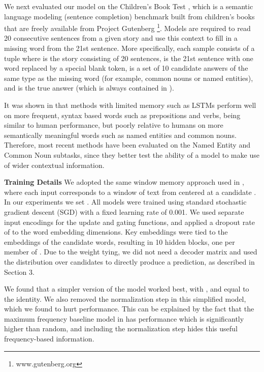 \documentclass{article} \usepackage{iclr2016_conference,times}
\begin{document}
We next evaluated our model on the Children's Book Test \citep{CBT}, which is a semantic language modeling (sentence completion) 
benchmark built from children's books that are freely available from Project Gutenberg \footnote{www.gutenberg.org}. 
Models are required to read 20 consecutive sentences from a given story and use this context to fill in a missing word from the 21st sentence. 
More specifically, each sample consists of a tuple  where  is the story consisting of 20 sentences,  is the 21st sentence with one word replaced by a special blank token,  is a set of 10 candidate answers of the same type as the missing word (for example, common nouns or named entities), and  is the true answer (which is always contained in ).

It was shown in \citep{CBT} that methods with limited memory such as LSTMs perform well on more frequent, syntax based
words such as prepositions and verbs, being similar to human performance, but poorly relative to humans on more semantically meaningful words such as named entities and common nouns.
Therefore, most recent methods have been evaluated on the Named Entity and Common Noun subtasks, since they better test the ability of a model to make use of wider contextual information. 


\textbf{Training Details} 
We adopted the same window memory approach used in \citep{CBT}, where each input corresponds to a window of text from  centered at a candidate . In our experiments we set . 
All models were trained using standard stochastic gradient descent (SGD) with a fixed learning rate of 0.001. 
We used separate input encodings for the update and gating functions, and applied a dropout rate of  to the word embedding dimensions.
Key embeddings were tied to the embeddings of the candidate words, resulting in 10 hidden blocks, one per member of .
Due to the weight tying, we did not need a decoder matrix and used the distribution over candidates to directly produce a prediction, as described in Section 3.

We found that a simpler version of the model worked best, with ,  and  equal to the identity.
We also removed the normalization step in this simplified model, which we found to hurt performance.
This can be explained by the fact that the maximum frequency baseline model in \citep{CBT} has performance which is significantly higher than random, and including the normalization step hides this useful frequency-based information.
\end{document}
